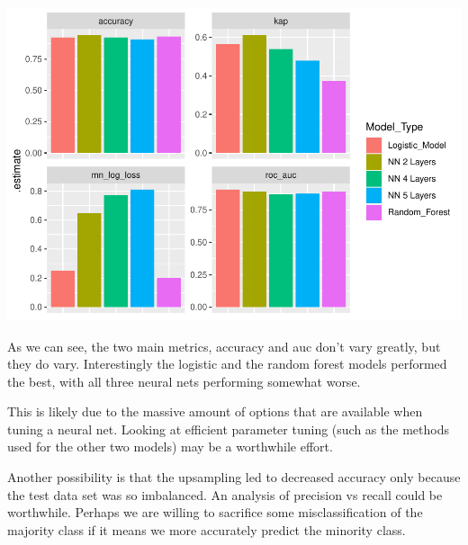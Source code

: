 \documentclass[
  11pt,
]{article}
\begin{document}
\includegraphics{Project-5-MTW_files/figure-latex/unnamed-chunk-16-1.pdf}

As we can see, the two main metrics, accuracy and auc don't vary
greatly, but they do vary. Interestingly the logistic and the random
forest models performed the best, with all three neural nets performing
somewhat worse.

This is likely due to the massive amount of options that are available
when tuning a neural net. Looking at efficient parameter tuning (such as
the methods used for the other two models) may be a worthwhile effort.

Another possibility is that the upsampling led to decreased accuracy
only because the test data set was so imbalanced. An analysis of
precision vs recall could be worthwhile. Perhaps we are willing to
sacrifice some misclassification of the majority class if it means we
more accurately predict the minority class.
\end{document}
